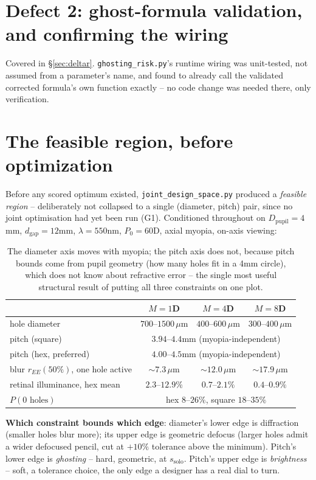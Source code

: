 \documentclass[11pt]{report}
\newcommand{\dgap}{d_{\text{gap}}}
\newcommand{\Dpupil}{D_{\text{pupil}}}
\begin{document}
\section{Defect 2: ghost-formula validation, and confirming the wiring}
Covered in \S\ref{sec:deltar}. \texttt{ghosting\_risk.py}'s runtime wiring was unit-tested,
not assumed from a parameter's name, and found to already call the validated corrected
formula's own function exactly -- no code change was needed there, only verification.

\section{The feasible region, before optimization}
\label{sec:feasibleregion}
Before any scored optimum existed, \texttt{joint\_design\_space.py} produced a
\emph{feasible region} -- deliberately not collapsed to a single (diameter, pitch) pair,
since no joint optimisation had yet been run (G1). Conditioned throughout on
$\Dpupil{=}4$mm, $\dgap{=}12$mm, $\lambda{=}550$nm, $P_0{=}60$D, axial myopia, on-axis
viewing:
\begin{table}[h!]
\centering\small
\begin{tabular}{lccc}
\toprule
& \textbf{$M{=}1$D} & \textbf{$M{=}4$D} & \textbf{$M{=}8$D} \\
\midrule
hole diameter & $700$--$1500\,\mu$m & $400$--$600\,\mu$m & $300$--$400\,\mu$m \\
pitch (square) & \multicolumn{3}{c}{$3.94$--$4.4$mm (myopia-independent)} \\
pitch (hex, preferred) & \multicolumn{3}{c}{$4.00$--$4.5$mm (myopia-independent)} \\
blur $r_{EE}(50\%)$, one hole active & $\sim7.3\,\mu$m & $\sim12.0\,\mu$m & $\sim17.9\,\mu$m \\
retinal illuminance, hex mean & $2.3$--$12.9\%$ & $0.7$--$2.1\%$ & $0.4$--$0.9\%$ \\
$P(\text{0 holes})$ & \multicolumn{3}{c}{hex $8$--$26\%$, square $18$--$35\%$} \\
\bottomrule
\end{tabular}
\caption{The diameter axis moves with myopia; the pitch axis does not, because pitch bounds
come from pupil geometry (how many holes fit in a 4mm circle), which does not know about
refractive error -- the single most useful structural result of putting all three
constraints on one plot.}
\end{table}
\textbf{Which constraint bounds which edge}: diameter's lower edge is diffraction (smaller
holes blur more); its upper edge is geometric defocus (larger holes admit a wider defocused
pencil, cut at $+10\%$ tolerance above the minimum). Pitch's lower edge is
\emph{ghosting} -- hard, geometric, at $s_{\text{solo}}$. Pitch's upper edge is
\emph{brightness} -- soft, a tolerance choice, the only edge a designer has a real dial to
turn.
\end{document}
